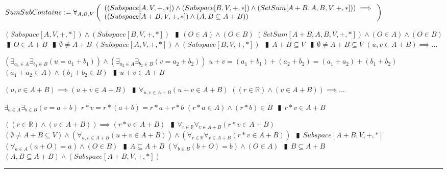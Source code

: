 \documentclass{book}
\newcommand{\abr}{:=}
\newcommand{\pipe}{$\phantom{(}\vrectangleblack\phantom{)}$}
\begin{document}
$SumSubContains \abr \forall_{A, B, V}\left(\begin{array}{ll}
  ((Subspace[A, V, +, *]) \land (Subspace[B, V, +, *]) \land (SetSum[A + B, A, B, V, +, *])) \hfill \implies \hfill \\
  ((Subspace[A + B, V, + ,*]) \land (A, B \subseteq A + B))
\end{array}\right)$
\begin{enumerate}
  \lit $(Subspace[A, V, +, *]) \land (Subspace[B, V, +, *])$ \pipe $(O \in A) \land (O \in B)$
  \lit $(SetSum[A + B, A, B, V, +, *]) \land (O \in A) \land (O \in B)$ \pipe $O \in A + B$ \pipe $\emptyset \neq A + B$
  \lit $(Subspace[A, V, +, *]) \land (Subspace[B, V, +, *])$ \pipe $A + B \subseteq V$ \pipe $\emptyset \neq A + B \subseteq V$
  \lit $(u, v \in A + B) \implies \ldots$
  \begin{enumerate}
    \lit $(\exists_{a_1 \in A} \exists_{b_1 \in B}(u = a_1 + b_1)) \land (\exists_{a_2 \in A} \exists_{b_2 \in B}(v = a_2 + b_2))$
    \lit $u + v = (a_1 + b_1) + (a_2 + b_2) = (a_1 + a_2) + (b_1 + b_2)$
    \lit $(a_1 + a_2 \in A) \land (b_1 + b_2 \in B)$ \pipe $u + v \in A + B$
  \end{enumerate}
  \lit $(u, v \in A + B) \implies (u + v \in A + B)$ \pipe $\forall_{u, v \in A + B}(u + v \in A + B)$
  \lit $((r \in \mathbb{R}) \land (v \in A + B)) \implies \ldots$
  \begin{enumerate}
    \lit $\exists_{a \in A} \exists_{b \in B}(v = a + b)$
    \lit $r * v = r * (a + b) = r * a + r * b$
    \lit $(r * a \in A) \land (r * b) \in B$ \pipe $r * v \in A + B$
  \end{enumerate}
  \lit $((r \in \mathbb{R}) \land (v \in A + B)) \implies (r * v \in A + B)$ \pipe $\forall_{r \in \mathbb{R}} \forall_{v \in A + B}(r * v \in A + B)$
  \lit $(\emptyset \neq A + B \subseteq V) \land (\forall_{u, v \in A + B}(u + v \in A + B)) \land (\forall_{r \in \mathbb{R}} \forall_{v \in A + B}(r * v \in A + B))$ \pipe $Subspace[A + B, V, + ,*]$
  \lit $(\forall_{a \in A}(a + O) = a) \land (O \in B)$ \pipe $A \subseteq A + B$
  \lit $(\forall_{b \in B}(b + O) = b) \land (O \in A)$ \pipe $B \subseteq A + B$
  \lit $(A, B \subseteq A + B) \land (Subspace[A + B, V, + ,*])$
\end{enumerate} \vspace{.75mm} \hrule \vspace{.75mm} \ \\
\end{document}
